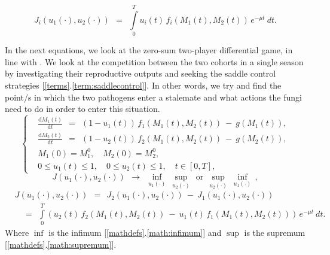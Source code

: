 \documentclass[11pt]{amsart}
\begin{document}
\begin{equation}
J_i\left(u_1(\cdot), u_2(\cdot)\right) \:\: = \:\: \int\limits_0^T u_i(t) \, f_i\left(M_1(t),
  M_2(t)\right) \, e^{-\mu t} \: dt.  \label{3}
\end{equation}


In the next equations, we look at the zero-sum two-player differential game, in line with \cite{YegorovGrognardMailleretHalkettBernhard2019,
BernhardGrognardMailleretAkhmetzhanov2010}.
We look at the competition between the two cohorts in a single season by investigating their reproductive outputs and seeking the saddle control strategies [\ref{terms}.\ref{term:saddlecontrol}]. In other words, we try and find the point/s in which the two pathogens enter a stalemate and what actions the fungi need to do in order to enter this situation.
\begin{equation}
\left\{ \begin{aligned}
& \frac{\mathrm{d} M_1(t)}{\mathrm{d} t} \:\: = \:\: \left(1 - u_1(t)\right) \,
  f_1\left(M_1(t), M_2(t)\right) \: - \: g\left(M_1(t)\right), \\
& \frac{\mathrm{d} M_2(t)}{\mathrm{d} t} \:\: = \:\: \left(1 - u_2(t)\right) \,
  f_2\left(M_1(t), M_2(t)\right) \: - \: g\left(M_2(t)\right), \\
& M_1(0) = M_1^0, \quad M_2(0) = M_2^0, \\
& 0 \leqslant u_1(t) \leqslant 1, \quad 0 \leqslant u_2(t) \leqslant 1,
  \quad t \in [0, T],
\end{aligned} \right.  \label{7}
\end{equation}
\begin{equation}
J(u_1(\cdot), u_2(\cdot)) \:\: \longrightarrow \:\: 
\inf_{u_1(\cdot)} \:  \sup_{u_2(\cdot)} 
\:\: \mbox{or} \:\:
\sup_{u_2(\cdot)} \: \inf_{u_1(\cdot)} \, ,  \label{8}
\end{equation}
\begin{equation}
\begin{aligned}
& J\left(u_1(\cdot), u_2(\cdot)\right) \:\: = \:\: J_2\left(u_1(\cdot), u_2(\cdot)\right) \: - \:
J_1\left(u_1(\cdot), u_2(\cdot)\right) \\
& \quad
= \:\: \int\limits_0^T \left( u_2(t) \, f_2(M_1(t), M_2(t)) \: - \: u_1(t)
  \, f_1(M_1(t), M_2(t)) \right) \,
e^{-\mu t} \: dt.
\end{aligned}  \label{9}
\end{equation}
Where $\inf$ is the infimum [\ref{mathdefs}.\ref{math:infimum}] and $\sup$ is the supremum [\ref{mathdefs}.\ref{math:supremum}].
\end{document}
